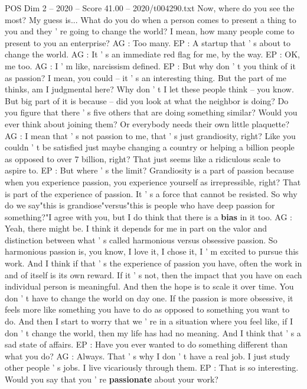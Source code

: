 \begin{textsample}{POS Dim 2 – 2020 – Score 41.00 – 2020/t004290.txt}
Now, where do you see the most?
My guess is...
What do you do when a person comes to present a thing to you and they ' re going to change the world?
I mean, how many people come to present to you an enterprise?
AG : Too many.
EP : A startup that ' s about to change the world.
AG : It ' s an immediate red flag for me, by the way.
EP : OK, me too.
AG : I ' m like, narcissism defined.
EP : But why don ' t you think of it as passion?
I mean, you could -- it ' s an interesting thing.
But the part of me thinks, am I judgmental here?
Why don ' t I let these people think -- you know.
But big part of it is because -- did you look at what the neighbor is doing?
Do you figure that there ' s five others that are doing something similar?
Would you ever think about joining them?
Or everybody needs their own little plaquette?
AG : I mean that ' s not passion to me, that ' s just grandiosity, right?
Like you couldn ' t be satisfied just maybe changing a country or helping a billion people as opposed to over 7 billion, right?
That just seems like a ridiculous scale to aspire to.
EP : But where ' s the limit?
Grandiosity is a part of passion because when you experience passion, you experience yourself as irrepressible, right?
That is part of the experience of passion.
It ' s a force that cannot be resisted.
So why do we say"this is grandiose"versus"this is people who have deep passion for something?"I agree with you, but I do think that there is a \textbf{bias} in it too.
AG : Yeah, there might be.
I think it depends for me in part on the valor and distinction between what ' s called harmonious versus obsessive passion.
So harmonious passion is, you know, I love it, I chose it, I ' m excited to pursue this work.
And I think if that ' s the experience of passion you have, often the work in and of itself is its own reward.
If it ' s not, then the impact that you have on each individual person is meaningful.
And then the hope is to scale it over time.
You don ' t have to change the world on day one.
If the passion is more obsessive, it feels more like something you have to do as opposed to something you want to do.
And then I start to worry that we ' re in a situation where you feel like, if I don ' t change the world, then my life has had no meaning.
And I think that ' s a sad state of affairs.
EP : Have you ever wanted to do something different than what you do?
AG : Always.
That ' s why I don ' t have a real job.
I just study other people ' s jobs.
I live vicariously through them.
EP : That is so interesting.
Would you say that you ' re \textbf{passionate} about your work?

\end{textsample}

